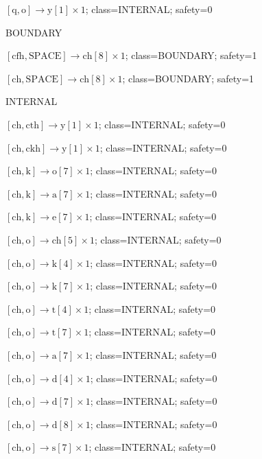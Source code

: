 \(\left[\mathrm{q}, \mathrm{o}\right] \to \mathrm{y}[1] \times 1\); class=INTERNAL; safety=0\par
BOUNDARY\par
\(\left[\mathrm{cfh}, \mathrm{SPACE}\right] \to \mathrm{ch}[8] \times 1\); class=BOUNDARY; safety=1\par
\(\left[\mathrm{ch}, \mathrm{SPACE}\right] \to \mathrm{ch}[8] \times 1\); class=BOUNDARY; safety=1\par
INTERNAL\par
\(\left[\mathrm{ch}, \mathrm{cth}\right] \to \mathrm{y}[1] \times 1\); class=INTERNAL; safety=0\par
\(\left[\mathrm{ch}, \mathrm{ckh}\right] \to \mathrm{y}[1] \times 1\); class=INTERNAL; safety=0\par
\(\left[\mathrm{ch}, \mathrm{k}\right] \to \mathrm{o}[7] \times 1\); class=INTERNAL; safety=0\par
\(\left[\mathrm{ch}, \mathrm{k}\right] \to \mathrm{a}[7] \times 1\); class=INTERNAL; safety=0\par
\(\left[\mathrm{ch}, \mathrm{k}\right] \to \mathrm{e}[7] \times 1\); class=INTERNAL; safety=0\par
\(\left[\mathrm{ch}, \mathrm{o}\right] \to \mathrm{ch}[5] \times 1\); class=INTERNAL; safety=0\par
\(\left[\mathrm{ch}, \mathrm{o}\right] \to \mathrm{k}[4] \times 1\); class=INTERNAL; safety=0\par
\(\left[\mathrm{ch}, \mathrm{o}\right] \to \mathrm{k}[7] \times 1\); class=INTERNAL; safety=0\par
\(\left[\mathrm{ch}, \mathrm{o}\right] \to \mathrm{t}[4] \times 1\); class=INTERNAL; safety=0\par
\(\left[\mathrm{ch}, \mathrm{o}\right] \to \mathrm{t}[7] \times 1\); class=INTERNAL; safety=0\par
\(\left[\mathrm{ch}, \mathrm{o}\right] \to \mathrm{a}[7] \times 1\); class=INTERNAL; safety=0\par
\(\left[\mathrm{ch}, \mathrm{o}\right] \to \mathrm{d}[4] \times 1\); class=INTERNAL; safety=0\par
\(\left[\mathrm{ch}, \mathrm{o}\right] \to \mathrm{d}[7] \times 1\); class=INTERNAL; safety=0\par
\(\left[\mathrm{ch}, \mathrm{o}\right] \to \mathrm{d}[8] \times 1\); class=INTERNAL; safety=0\par
\(\left[\mathrm{ch}, \mathrm{o}\right] \to \mathrm{s}[7] \times 1\); class=INTERNAL; safety=0\par

